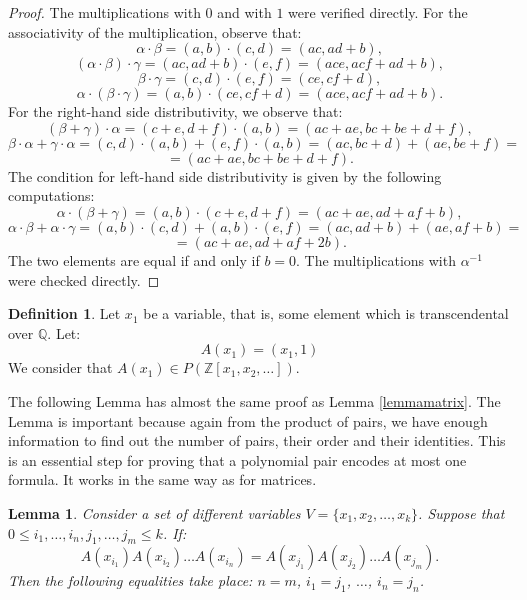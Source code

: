\documentclass{article}
\theoremstyle{plain}
\newtheorem{lemma}{Lemma}[section]
\theoremstyle{definition}
\newtheorem{definition}{Definition}[section]
\begin{document}
\begin{proof}
    The multiplications with $0$ and with $1$ were verified directly. For the associativity of the multiplication, observe that:
    $$\alpha \cdot \beta = (a, b) \cdot (c, d) = (ac, ad+b),$$
    $$(\alpha \cdot \beta) \cdot \gamma = (ac, ad+b) \cdot (e, f) = (ace, acf + ad + b),$$
    $$\beta \cdot \gamma = (c,d) \cdot (e,f) = (ce, cf + d),$$
    $$\alpha \cdot (\beta \cdot \gamma) = (a,b) \cdot (ce, cf + d) = (ace, acf + ad + b).$$
    For the right-hand side distributivity, we observe that:
    $$(\beta + \gamma)\cdot \alpha = (c+e, d+f) \cdot (a,b) = (ac + ae, bc + be + d + f),$$
    $$\beta \cdot \alpha + \gamma \cdot \alpha = (c,d)\cdot(a,b) +(e,f)\cdot(a,b) = (ac, bc+d) + (ae, be + f) = $$ $$ =(ac + ae, bc + be + d + f).$$
    The condition for left-hand side distributivity is given by the following computations: 
    $$\alpha \cdot (\beta + \gamma) = (a,b) \cdot (c+e, d+f) = (ac + ae, ad + af + b),$$
    $$\alpha \cdot \beta + \alpha \cdot \gamma = (a,b)\cdot(c,d) +(a,b) \cdot (e,f) = (ac, ad+b) + (ae, af+b) =$$ $$ =(ac+ae, ad + af + 2b).$$
    The two elements are equal if and only if $b=0$. 
    The multiplications with $\alpha^{-1}$ were checked directly. 
    
\end{proof} 


\begin{definition}\label{defpairvar}
    Let $x_1$ be a variable, that is, some element which is transcendental over $\mathbb Q$. Let:
    $$A(x_1) = (x_1, 1)$$
    We consider that $A(x_1) \in P(\mathbb Z[x_1, x_2, \dots])$. 
\end{definition} 

The following Lemma has almost the same proof as Lemma \ref{lemmamatrix}. The Lemma is important because again from the product of pairs, we have enough information to find out the number of pairs, their order and their identities. This is an essential step for proving that a polynomial pair encodes at most one formula. It works in the same way as for matrices. 

\begin{lemma}\label{lemmapair}
    Consider a set of different variables $V = \{x_1, x_2, \dots, x_k\}$. Suppose that $0 \leq i_1, \dots, i_n, j_1, \dots, j_m \leq k$. If:
    $$A(x_{i_1}) A(x_{i_2}) \dots A(x_{i_n}) = A(x_{j_1}) A(x_{j_2}) \dots A(x_{j_m}).$$
    Then the following equalities take place: $n = m$, $i_1 = j_1$, $\dots$, $i_n = j_n$.
\end{lemma} 
\end{document}
